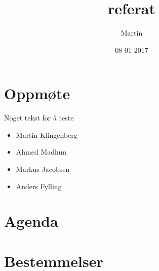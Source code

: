 \documentclass[10pt,a4paper]{referat}
\title{referat}
\author{Martin}
\date{08 01 2017}
\begin{document}
	
	\maketitle
	
	
	\section{Oppmøte}
	Noget tekst for å teste
	\begin{itemize}
		\item Martin Klingenberg
		\item Ahmed Madhun
		\item Markus Jacobsen
		\item Anders Fylling
	\end{itemize}
	
	\section{Agenda}
	
	\section{Bestemmelser}
	
\end{document}
